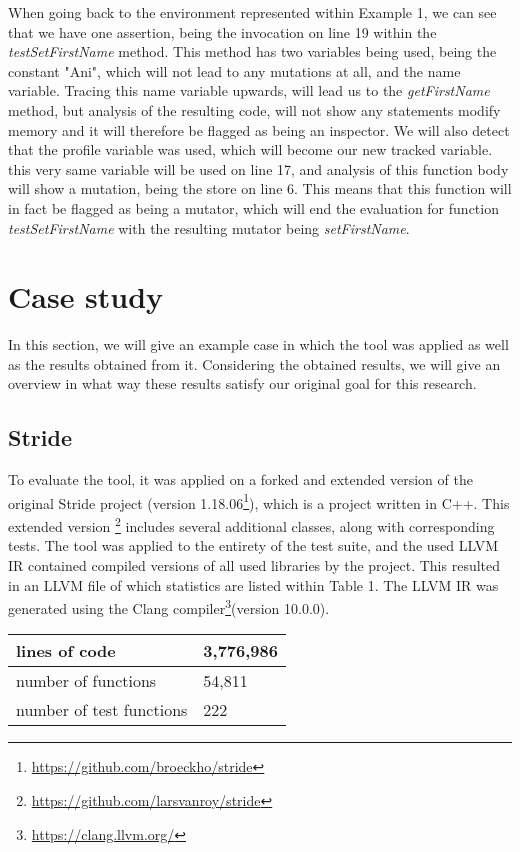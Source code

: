 \documentclass[11pt]{article}
\begin{document}
\begin{multicols}{2}
When going back to the environment represented within Example 1, we can see that we have one assertion, being the invocation on line 19 within the \textit{testSetFirstName} method. This method has two variables being used, being the constant "Ani", which will not lead to any mutations at all, and the name variable. Tracing this name variable upwards, will lead us to the \textit{getFirstName} method, but analysis of the resulting code, will not show any  statements modify memory and it will therefore be flagged as being an inspector. We will also detect that the profile variable was used, which will become our new tracked variable. this very same variable will be used on line 17, and analysis of this function body will show a mutation, being the store on line 6. This means that this function will in fact be flagged as being a mutator, which will end the evaluation for function \textit{testSetFirstName} with the resulting mutator being \textit{setFirstName}.

\section{Case study}
In this section, we will give an example case in which the tool was applied as well as the results obtained from it. Considering the obtained results, we will give an overview in what way these results satisfy our original goal for this research.

\subsection{Stride}
To evaluate the tool, it was applied on a forked and extended version of the original Stride project (version 1.18.06\footnote{\url{https://github.com/broeckho/stride}}), which is a project written in C++. This extended version \footnote{\url{https://github.com/larsvanroy/stride}} includes several additional classes, along with corresponding tests. The tool was applied to the entirety of the test suite, and the used LLVM IR contained compiled versions of all used libraries by the project. This resulted in an LLVM file of which statistics are listed within Table 1. The LLVM IR was generated using the Clang compiler\footnote{\url{https://clang.llvm.org/}}(version 10.0.0).

\begin{center}
	\begin{tabular}{ |p{4.5cm}|p{2.5cm}|  }
		\hline
		lines of code & 3,776,986\\
		\hline
		number of functions   & 54,811\\
		\hline
		number of test functions &   222\\
		\hline
	\end{tabular}
\end{center}


\end{multicols}
\end{document}
